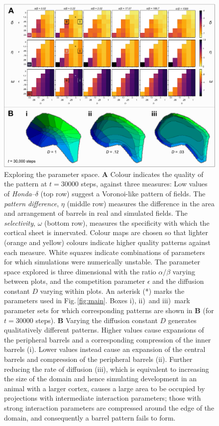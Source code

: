 \documentclass[9pt,lineno]{elife}
\newcommand{\cmnt}[1]{\textcolor{colcmnt}{#1}}
\begin{document}
\begin{figure}
  \begin{fullwidth}
    \includegraphics[width=\linewidth]{./Fig2.pdf}
    \caption{\cmnt{Exploring the parameter space.
        \textbf{A} Colour indicates the quality of the pattern at $t=30000$
        steps, against three measures: Low values of \emph{Honda}--$\delta$
        (top row) suggest a Voronoi-like pattern of fields. The \emph{pattern
          difference}, $\eta$ (middle row) measures the difference in the area
        and arrangement of barrels in real and simulated fields. The
        \emph{selectivity}, $\omega$ (bottom row), measures the specificity
        with which the cortical sheet is innervated. Colour maps are chosen so
        that lighter (orange and yellow) colours indicate higher quality
        patterns against each measure. White squares indicate combinations of
        parameters for which simulations were numerically unstable.
        The parameter space explored is three dimensional with the ratio
        $\alpha/\beta$ varying between plots, and the competition parameter
        $\epsilon$ and the diffusion constant $D$ varying within plots. An
        asterisk (*) marks the parameters used in Fig.\,\ref{fig:main}. Boxes
        i), ii)~and iii)~mark parameter sets for which corresponding patterns
        are shown in \textbf{B} (for $t=30000$ steps).
        \textbf{B} Varying the diffusion constant $D$ generates qualitatively
        different patterns. Higher values cause expansions of the peripheral
        barrels and a corresponding compression of the inner barrels
        (i). Lower values instead cause an expansion of the central barrels
        and compression of the peripheral barrels (ii). Further reducing the
        rate of diffusion (iii), which is equivalent to increasing the size of
        the domain and hence simulating development in an animal with a larger
        cortex, causes a large area to be occupied by projections with
        intermediate interaction parameters; those with strong interaction
        parameters are compressed around the edge of the domain, and
        consequently a barrel pattern fails to form.}}
    \label{fig:paramsweep}
  \end{fullwidth}
\end{figure}
\end{document}
